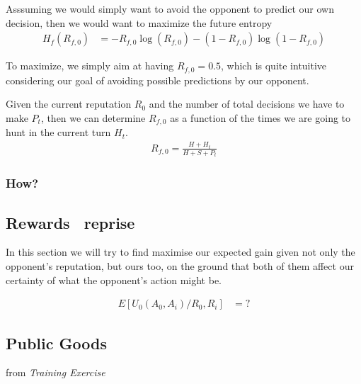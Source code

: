\documentclass[10pt,fleqn]{article}
\begin{document}
Asssuming we would simply want to avoid the opponent to predict our own
decision, then we would want to maximize the future entropy
\begin{align*}
  H_f(R_{f, 0}) &= - R_{f, 0} \log(R_{f, 0}) - (1-R_{f, 0}) \log(1-R_{f, 0})
\end{align*}

To maximize, we simply aim at having $R_{f, 0} = 0.5$, which is quite
intuitive considering our goal of avoiding possible predictions by our opponent.

Given the current reputation $R_0$ and the number of total decisions we have to
make $P_t$, then we can determine $R_{f, 0}$ as a function of the times we are
going to hunt in the current turn $H_t$.
\begin{align*}
  R_{f, 0} = \frac{H+H_t}{H+S+P_t}
\end{align*}

\subsubsection{How?}

\subsection{Rewards \dash\ reprise}

In this section we will try to find maximise our expected gain given not only the
opponent's reputation, but ours too, on the ground that both of them affect our
certainty of what the opponent's action might be.

\begin{align*}
  E[U_0(A_0, A_i) / R_0, R_i] &= ?
\end{align*}

\subsection{Public Goods}
\begin{quotation}
\end{quotation}
\hfill from \emph{Training Exercise}
\end{document}
